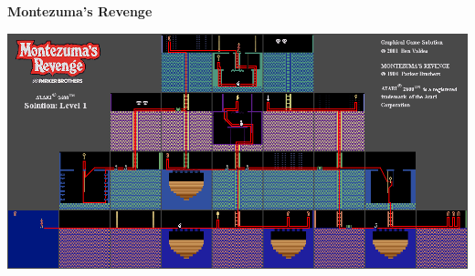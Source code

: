 \documentclass{beamer}
\begin{document}
\begin{frame}{\bf Montezuma's Revenge}

  \includegraphics[scale=0.32]{../images/montezuma_map.png}
  
  \end{frame}
  
\end{document}
